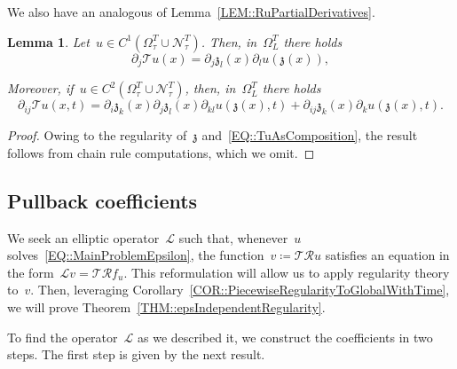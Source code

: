 \documentclass[12pt,a4paper]{amsart}
\numberwithin{equation}{section}
\newtheorem{lemma}[theorem]{Lemma}
\theoremstyle{definition}
\theoremstyle{remark}
\begin{document}
We also have an analogous of Lemma~\ref{LEM::RuPartialDerivatives}.

\begin{lemma}
    Let~$u \in C^1(\Omega_\tau^T \cup \mathcal{N}_\tau^T)$. Then, in~$\Omega_L^T$ there holds
    \begin{equation}
        \partial_j \mathcal{T}u(x) = \partial_j \mathfrak{z}_l(x) \partial_l u(\mathfrak{z}(x)),
    \end{equation}

    Moreover, if~$u \in C^2(\Omega_\tau^T \cup \mathcal{N}_\tau^T)$, then, in~$\Omega_L^T$ there holds
    \begin{equation}\label{EQ::TuPartialSecondDerivatives}
        \partial_{ij} \mathcal{T}u(x,t) = \partial_i \mathfrak{z}_k(x) \partial_j \mathfrak{z}_l(x)\partial_{kl} u(\mathfrak{z}(x),t) + \partial_{ij} \mathfrak{z}_k (x) \partial_k u(\mathfrak{z}(x),t).
    \end{equation}
\end{lemma}
\begin{proof}
    Owing to the regularity of~$\mathfrak{z}$ and~\eqref{EQ::TuAsComposition}, the result follows from chain rule computations, which we omit.
\end{proof}

\subsection{Pullback coefficients}
We seek an elliptic operator~$\mathcal{L}$ such that, whenever~$u$ solves~\eqref{EQ::MainProblemEpsilon}, the function~$v \coloneq \mathcal{T}\mathcal{R}u$ satisfies an equation in the form~$\mathcal{L}v = \mathcal{T}\mathcal{R}f_u$. This reformulation will allow us to apply regularity theory to~$v$. Then, leveraging Corollary~\ref{COR::PiecewiseRegularityToGlobalWithTime}, we will prove Theorem~\ref{THM::epsIndependentRegularity}.

To find the operator~$\mathcal{L}$ as we described it, we construct the coefficients in two steps. The first step is given by the next result.
\end{document}
